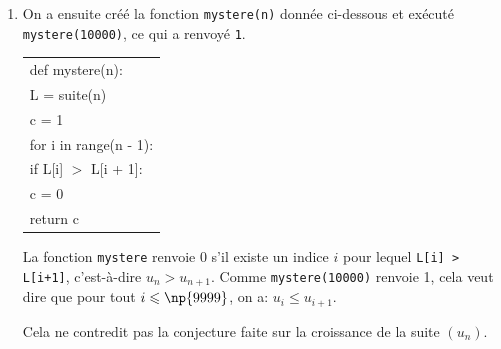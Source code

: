 \begin{enumerate}
La suite $(u_n)$ semble croissante, mais on ne peut pas se prononcer sur sa limite.

		\item On a ensuite créé la fonction \texttt{mystere(n)} donnée ci-dessous et exécuté \linebreak \texttt{mystere(10000)}, ce qui a renvoyé \texttt{1}.


\begin{center}
		\begin{ttfamily}
\begin{tabularx}{\linewidth}{|X|}\hline
			def mystere(n):\\
			\quad L = suite(n)\\
			\quad	c = 1\\
			\quad	for i in range(n - 1):\\
			\qquad	if L[i] $>$ L[i + 1]:\\
			\qquad \quad c = 0\\
			\quad return c\\ \hline
\end{tabularx}
		\end{ttfamily}
		\end{center}

La fonction \texttt{mystere} renvoie 0 s'il existe un indice $i$ pour lequel \texttt{L[i] > L[i+1]}, c'est-à-dire $u_{n}>u_{n+1}$. Comme \texttt{mystere(10000)} renvoie 1, cela veut dire que pour tout $i\leqslant \np{9999}$, on a: $u_{i} \leqslant u_{i+1}$.

Cela ne contredit pas la conjecture faite sur la croissance de la suite $(u_n)$.


	\end{enumerate}

